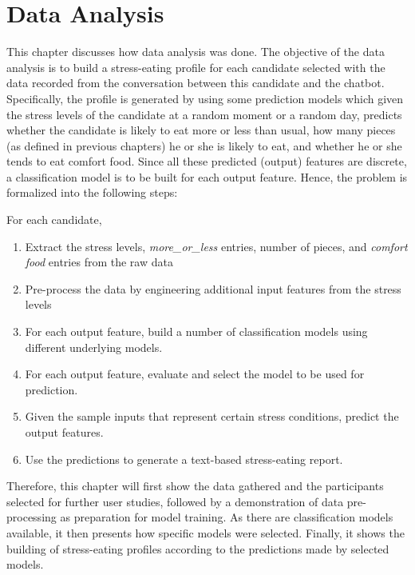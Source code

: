 
\chapter{Data Analysis}\label{chapter:data_analysis}
This chapter discusses how data analysis was done. The objective of the data analysis is to build a stress-eating profile for each candidate selected with the data recorded from the conversation between this candidate and the chatbot. Specifically, the profile is generated by using some prediction models which given the stress levels of the candidate at a random moment or a random day, predicts whether the candidate is likely to eat more or less than usual, how many pieces (as defined in previous chapters) he or she is likely to eat, and whether he or she tends to eat comfort food. Since all these predicted (output) features are discrete, a classification model is to be built for each output feature. Hence, the problem is formalized into the following steps:\bigskip

\noindent For each candidate,
\begin{enumerate}
  \item Extract the stress levels, \emph{more\_or\_less} entries, number of pieces, and \emph{comfort food} entries from the raw data
  \item Pre-process the data by engineering additional input features from the stress levels
  \item For each output feature, build a number of classification models using different underlying models.
  \item For each output feature, evaluate and select the model to be used for prediction.
  \item Given the sample inputs that represent certain stress conditions, predict the output features.
  \item Use the predictions to generate a text-based stress-eating report.
\end{enumerate}

Therefore, this chapter will first show the data gathered and the participants selected for further user studies, followed by a demonstration of data pre-processing as preparation for model training. As there are classification models available, it then presents how specific models were selected. Finally, it shows the building of stress-eating profiles according to the predictions made by selected models.

